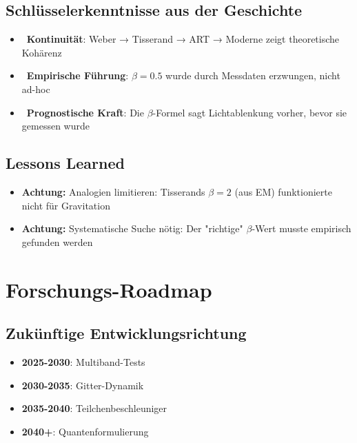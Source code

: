 \documentclass{article}
\begin{document}
\subsection*{Schlüsselerkenntnisse aus der Geschichte}
\begin{itemize}
    \item \checkmark~\textbf{Kontinuität}: Weber → Tisserand → ART → Moderne zeigt theoretische Kohärenz
    \item \checkmark~\textbf{Empirische Führung}: $\beta=0.5$ wurde durch Messdaten erzwungen, nicht ad-hoc
    \item \checkmark~\textbf{Prognostische Kraft}: Die $\beta$-Formel sagt Lichtablenkung vorher, bevor sie gemessen wurde
\end{itemize}

\subsection*{Lessons Learned}
\begin{itemize}
    \item \textbf{Achtung:} Analogien limitieren: Tisserands $\beta=2$ (aus EM) funktionierte nicht für Gravitation
    \item \textbf{Achtung:} Systematische Suche nötig: Der "richtige" $\beta$-Wert musste empirisch gefunden werden
\end{itemize}

\section{Forschungs-Roadmap}
\subsection*{Zukünftige Entwicklungsrichtung}
\begin{itemize}
    \item \textbf{2025-2030}: Multiband-Tests
    \item \textbf{2030-2035}: Gitter-Dynamik
    \item \textbf{2035-2040}: Teilchenbeschleuniger
    \item \textbf{2040+}: Quantenformulierung
\end{itemize}
\end{document}
